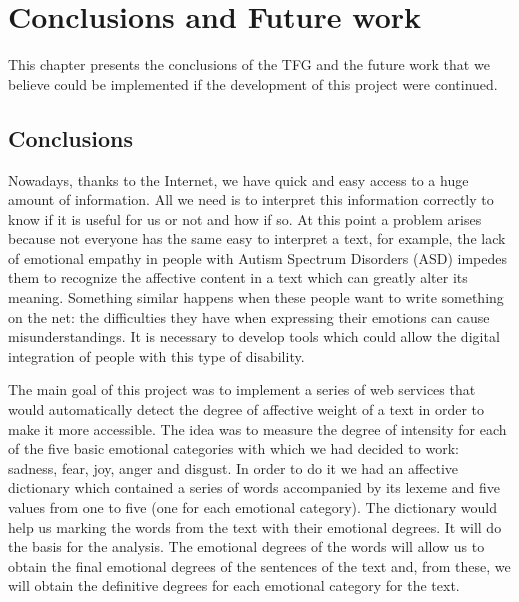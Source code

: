 %
%
\setlength{\parskip}{10pt}
\chapter{Conclusions and Future work}

\begin{resumen}
This chapter presents the conclusions of the TFG and the future work that we believe could be implemented if the development of this project were continued.
\end{resumen}

\section{Conclusions}
\label{cap12:sec:conclusiones}

Nowadays, thanks to the Internet, we have quick and easy access to a huge amount of information. All we need is to interpret this information correctly to know if it is useful for us or not and how if so. At this point a problem arises because not everyone has the same easy to interpret a text, for example, the lack of emotional empathy in people with Autism Spectrum Disorders (ASD) impedes them to recognize the affective content in a text which can greatly alter its meaning. Something similar happens when these people want to write something on the net: the difficulties they have when expressing their emotions can cause misunderstandings. It is necessary to develop tools which could allow the digital integration of people with this type of disability.

The main goal of this project was to implement a series of web services that would automatically detect the degree of affective weight of a text in order to make it more accessible. The idea was to measure the degree of intensity for each of the five basic emotional categories with which we had decided to work: sadness, fear, joy, anger and disgust. In order to do it we had an affective dictionary which contained a series of words accompanied by its lexeme and five values from one to five (one for each emotional category). The dictionary would help us marking the words from the text with their emotional degrees. It will do the basis for the analysis. The emotional degrees of the words will allow us to obtain the final emotional degrees of the sentences of the text and, from these, we will obtain the definitive degrees for each emotional category for the text.

